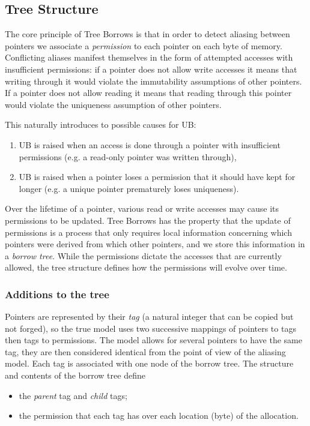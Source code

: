 \documentclass[a4paper,11pt]{article}
\theoremstyle{plain}
\theoremstyle{definition}
\theoremstyle{remark}
\begin{document}
\subsection{Tree Structure}
\label{sec:tree-structure}

The core principle of Tree Borrows is that in order to detect aliasing between
pointers we associate a \textit{permission} to each pointer on each byte of memory.
Conflicting aliases manifest themselves in the form of attempted accesses with
insufficient permissions: if a pointer does not allow write accesses it means that
writing through it would violate the immutability assumptions of other pointers.
If a pointer does not allow reading it means that reading through this pointer
would violate the uniqueness assumption of other pointers.

This naturally introduces to possible causes for UB:
\begin{enumerate}
    \item UB is raised when an access is done through a pointer with insufficient permissions
        (e.g. a read-only pointer was written through),
    \item UB is raised when a pointer loses a permission that it should have kept for longer
        (e.g. a unique pointer prematurely loses uniqueness).
\end{enumerate}

Over the lifetime of a pointer, various read or write accesses may cause its permissions to be updated.
Tree Borrows has the property that the update of permissions is a process
that only requires local information concerning which pointers were derived from
which other pointers, and we store this information in a \textit{borrow tree}.
While the permissions dictate the accesses that are currently allowed, the tree
structure defines how the permissions will evolve over time.

\subsubsection{Additions to the tree}
\label{sec:tree_additions}

Pointers are represented by their \textit{tag} (a natural integer that can
be copied but not forged), so the true model uses two successive mappings of pointers to tags then
tags to permissions. The model allows for several pointers to have the same tag,
they are then considered identical from the point of view of the aliasing model.
Each tag is associated with one node of the borrow tree. The structure and contents of the borrow tree
define
\begin{itemize}
    \item the \textit{parent} tag and \textit{child} tags;
    \item the permission that each tag has over each location (byte) of the allocation.
\end{itemize}
\end{document}
